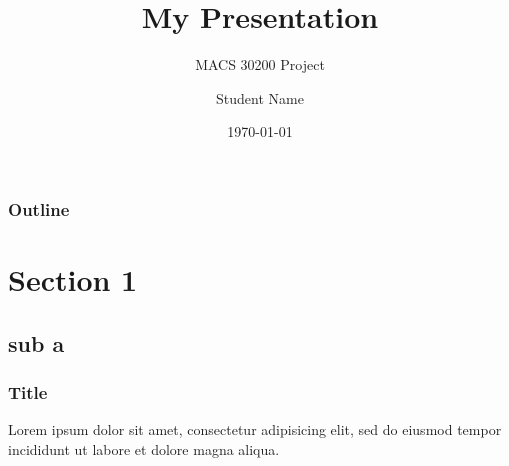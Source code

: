 \documentclass{beamer}
\title{My Presentation}
\subtitle{MACS 30200 Project}
\author{Student Name}
\institute{University of Chicago}
\date{\today}
\begin{document}
\begin{frame}
\titlepage
\end{frame}

\begin{frame}
\frametitle{Outline}
\tableofcontents
\end{frame}

\section{Section 1}
\subsection{sub a}

\begin{frame}
\frametitle{Title}
Lorem ipsum dolor sit amet, consectetur adipisicing elit, sed do eiusmod tempor incididunt ut labore et dolore magna aliqua.
\end{frame}
\end{document}
